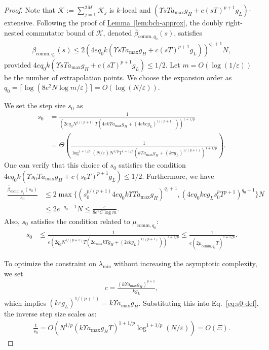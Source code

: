 \documentclass[11pt]{article}
\newcommand{\lem}[1]{\hyperref[lem:#1]{Lemma~\ref*{lem:#1}}}
\newcommand{\eps}{\varepsilon}
\newcommand{\mc}{\mathcal}
\begin{document}
\begin{proof}
    Note that $\mc K:= \sum_{j=1}^{2M} {\mc K}_j$ is $k$-local and $(\Upsilon sT a_{\max}g_H+c(sT)^{p+1} g_L)$-extensive.
    Following the proof of \lem{bch-approx}, the doubly right-nested commutator bound of $\mc K$, denoted $\bar{\beta}_{\mathrm{comm}, q_0}(s)$, satisfies 
    \begin{align*}
        \bar{\beta}_{\mathrm{comm}, q_0}(s) \le 2(4eq_0 k(\Upsilon sT a_{\max}g_H+c(sT)^{p+1} g_L))^{q_0+1}N,
    \end{align*}
    provided $4eq_0 k(\Upsilon sT a_{\max}g_H+c(sT)^{p+1} g_L) \le 1/2$. 
    Let $m=O(\log(1/\eps))$ be the number of extrapolation points. We choose the expansion order as $q_0 = \lceil \log(8e^2N\log m/\eps) \rceil = O(\log(N/\eps))$. 
    
    We set the step size $s_0$ as
    \begin{align}
    \label{eq:s0-def}
        s_0 &= \frac{1}{(2eq_0 N^{1/(p+1)}T (4ek \Upsilon a_{\max} g_H + (4ekcg_L )^{1/(p+1)}))^{1+1/p}} \\
        & = \Theta\left( \frac{1}{ \log^{1+1/p}(N/\eps)  N^{1/p}T^{1+1/p}(k\Upsilon a_{\max} g_H +(kcg_L)^{1/(p+1)})^{1+1/p} } \right).\nonumber
    \end{align}
    One can verify that this choice of $s_0$ satisfies the condition $4eq_0 k(\Upsilon s_0T a_{\max}g_H+c(s_0T)^{p+1} g_L) \le 1/2$.
    Furthermore, we have
    \begin{align*}
         \frac{\bar{\beta}_{\mathrm{comm}, q_0}(s_0)}{s_0} & \le 2\max\{(s_0^{p/(p+1)}4eq_0k\Upsilon T a_{\max} g_H)^{q_0+1}, (4eq_0kcg_L s_0 ^pT^{p+1})^{q_0+1}\}N \\
         &\le 2e^{-q_0-1}N \le \frac{\eps}{8e^2C \log m}.
    \end{align*}
    Also, $s_0$ satisfies the condition related to $\mu_{\mathrm{comm}, q_0}$:
    \begin{align*}
        s_0 &\le \frac{1}{e(2q_0 N^{1/(p+1)} T(2 a_{\max} k\Upsilon g_H + (2ckg_L)^{1/(p+1)}))^{1+1/p}} \le \frac{1}{e(2\mu_{\mathrm{comm}, q_0}T)^{1+1/p}}. 
    \end{align*}
    
    To optimize the constraint on $\lambda_{\min}$ without increasing the asymptotic complexity, we set
    \begin{align}
    \label{eq:def-c}
        c = \frac{(k\Upsilon a_{\max}g_H)^{p+1}}{kg_L},
    \end{align}
    which implies $(kcg_L)^{1/(p+1)} = k\Upsilon a_{\max}g_H$. Substituting this into Eq.~\eqref{eq:s0-def}, the inverse step size scales as:
    \begin{align*}
        \frac{1}{s_0} = O\left( N^{1/p}(k\Upsilon a_{\max} g_H T)^{1+1/p} \log^{1+1/p}(N/\eps) \right) = O(\Xi).
    \end{align*}


\end{proof}
\end{document}
